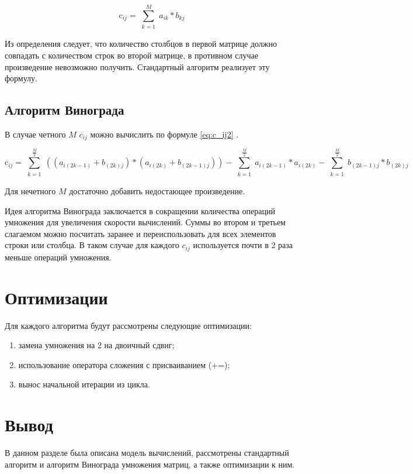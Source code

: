 \begin{equation}
	\label{eq:c_ij}
	\text{c}_{ij} = \sum_{\substack{k=1}}^M a_{ik} * b_{kj}
\end{equation}

Из определения следует, что количество столбцов в первой матрице должно совпадать с количеством строк во второй матрице, в противном случае произведение невозможно получить. Стандартный алгоритм реализует эту формулу.

\subsection{Алгоритм Винограда}

В случае четного $M$ $c_{ij}$ можно вычислить по формуле \ref{eq:c_ij2} \cite{vinograd}.

\begin{equation}
	\label{eq:c_ij2}
	\text{c}_{ij} = \sum_{\substack{k=1}}^{\frac{M}{2}} ((a_{i(2k-1)} + b_{(2k)j}) * (a_{i(2k)} + b_{(2k-1)j})) - 
	\sum_{\substack{k=1}}^{\frac{M}{2}} a_{i(2k-1)} * a_{i(2k)} -
	\sum_{\substack{k=1}}^{\frac{M}{2}} b_{(2k-1)j} * b_{(2k)j}
\end{equation}

Для нечетного $M$ достаточно добавить недостающее произведение. 

Идея алгоритма Винограда заключается в сокращении количества операций умножения для увеличения скорости вычислений. Суммы во втором и третьем слагаемом можно посчитать заранее и переиспользовать для всех элементов строки или столбца. В таком случае для каждого $c_{ij}$ используется почти в 2 раза меньше операций умножения.

\section{Оптимизации}

Для каждого алгоритма будут рассмотрены следующие оптимизации:

\begin{enumerate}[label={\arabic*)}]
	\item замена умножения на 2 на двоичный сдвиг;
	\item использование оператора сложения с присваиванием ({+=});
	\item вынос начальной итерации из цикла.
\end{enumerate}

\section{Вывод}

В данном разделе была описана модель вычислений, рассмотрены стандартный алгоритм и алгоритм Винограда умножения матриц, а также оптимизации к ним.
